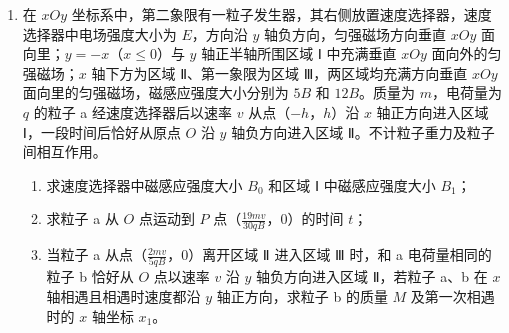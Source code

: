 \documentclass[\gkver]{gaokaozhenti}
\begin{document}
\begin{enumerate}
\item
在 $xOy$ 坐标系中，第二象限有一粒子发生器，其右侧放置速度选择器，速度选择器中电场强度大小为 $E$，方向沿 $y$ 轴负方向，匀强磁场方向垂直 $xOy$ 面向里；$y = -x$（$x \leq 0$）与 $y$ 轴正半轴所围区域 Ⅰ 中充满垂直 $xOy$ 面向外的匀强磁场；$x$ 轴下方为区域 Ⅱ、第一象限为区域 Ⅲ，两区域均充满方向垂直 $xOy$ 面向里的匀强磁场，磁感应强度大小分别为 $5B$ 和 $12B$。质量为 $m$，电荷量为 $q$ 的粒子 a 经速度选择器后以速率 $v$ 从点（$-h$，$h$）沿 $x$ 轴正方向进入区域 Ⅰ，一段时间后恰好从原点 $O$ 沿 $y$ 轴负方向进入区域 Ⅱ。不计粒子重力及粒子间相互作用。
\begin{enumerate}
	\item
	求速度选择器中磁感应强度大小 $B_{0}$ 和区域 Ⅰ 中磁感应强度大小 $B_{1}$；
	\item
	求粒子 a 从 $O$ 点运动到 $P$ 点（$\frac{19mv}{30qB}$，0）的时间 $t$；
	\item
	当粒子 a 从点（$\frac{2mv}{5qB}$，0）离开区域 Ⅱ 进入区域 Ⅲ 时，和 a 电荷量相同的粒子 b 恰好从 $O$ 点以速率 $v$ 沿 $y$ 轴负方向进入区域 Ⅱ，若粒子 a、b 在 $x$ 轴相遇且相遇时速度都沿 $y$ 轴正方向，求粒子 b 的质量 $M$ 及第一次相遇时的 $x$ 轴坐标 $x_{1}$。
\end{enumerate}
\onepicture[align=right, w=9.60cm]{}
\end{enumerate}
\end{document}
